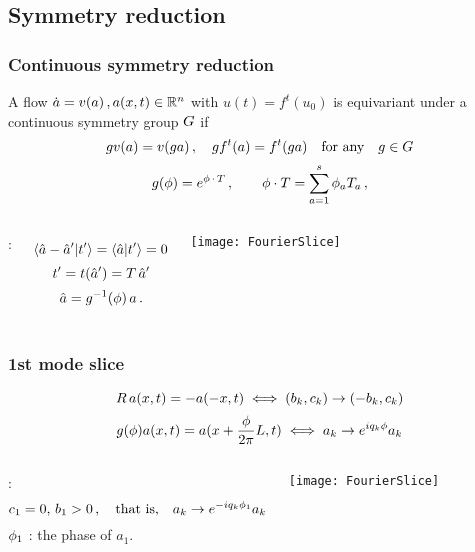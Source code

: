 \subsection{Symmetry reduction}

\begin{frame}%
  \frametitle{Continuous symmetry reduction}
  
  A flow
  $ \dot{a} = v(a) \,,a(x, t) \in \mathbb{R}^n$
  with $u(t)=f^t(u_0)$
  is {\color{blue} equivariant} under a continuous symmetry group $G$ if
  \begin{equation}
    \label{eq:equivariant}
    g v(a) =  v(g a) \,,\quad
    g f^t(a) =  f^t(g a)
    \quad \text{for any} \quad  g \in G
  \end{equation}
  \begin{equation}
    g({\bf \phi})=e^{{\bf \phi} \,\cdot\, T }
    \,,\qquad
    {\bf \phi} \cdot T  = \sum_{a=1}^s {\bf \phi}_a T_a
    \,,
    \label{eq:Lie}
  \end{equation}
  
  \pause
  
  \begin{columns}[c]

    {\centering {} :\par}
    \[
      \braket{\sspRed - \slicep}{\sliceTan{}} = \braket{\sspRed}{\sliceTan{}} = 0
    \]
    \[
      t'_{} = t({\hat{a}'}) = T \, {\hat{a}'}
    \]
    \[
      \hat{a} = g^{-1}({\bf \phi}) \, a
      \,.
    \]

    
    \texttt{[image: FourierSlice]}
    
  \end{columns}

\end{frame}

\begin{frame}%
  \frametitle{1st mode slice}
  \putssp

  \[
    R\,a(x,t) = -a(-x,t) \iff (b_k, c_k) \to (-b_k, c_k)
  \]
  \[
    g({\bf \phi}) a(x, t) = a (x+ \frac{{\bf \phi}}{2\pi}L,t)
    \iff
    a_k \to e^{iq_k{\bf \phi}} a_k
  \]
  
  \begin{columns}[c]

     : 
    \[
      c_1 = 0 ,\, b_1 >0\,, \quad \text{that is,} \quad
      a_k \to e^{-iq_k{\bf \phi}_1} a_k
    \]
    ${\bf \phi}_1$ : the phase of $a_1$.

    \texttt{[image: FourierSlice]}

  \end{columns}

\end{frame}

